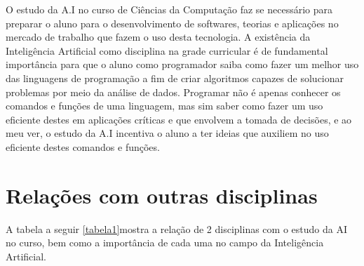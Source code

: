 \documentclass[10pt]{article}
\begin{document}
O estudo da A.I no curso de Ciências da Computação faz se necessário para preparar o aluno para o desenvolvimento de softwares, teorias e aplicações no mercado de trabalho que fazem o uso desta tecnologia. A existência da Inteligência Artificial como disciplina na grade curricular é de fundamental importância para que o aluno como programador saiba como fazer um melhor uso das linguagens de programação a fim de criar algoritmos capazes de solucionar problemas por meio da análise de dados. Programar não é apenas conhecer os comandos e funções de uma linguagem, mas sim saber como fazer um uso eficiente destes em aplicações  críticas e que envolvem a tomada de decisões, e ao meu ver, o estudo da A.I incentiva o aluno a ter ideias que auxiliem no uso eficiente destes comandos e funções.

\newpage
\section*{Relações com outras disciplinas}
A tabela a seguir \ref{tabela1}mostra a relação de 2 disciplinas com o estudo
da AI no curso, bem como a importância de cada uma no campo da Inteligência
Artificial.
\end{document}
